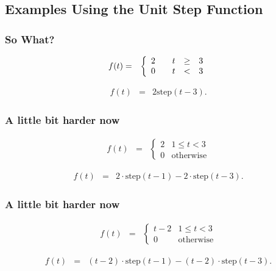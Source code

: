 \subsection{Examples Using the Unit Step Function}

\begin{frame}
  \frametitle{So What?}

  \begin{eqnarray*}
      f(t) & = & 
      \left\{
        \begin{array}{r@{\hspace{2em}}rcl}
          2 & t & \geq & 3 \\
          0 & t & < & 3
        \end{array}
      \right.
  \end{eqnarray*}

  {
    \begin{eqnarray*}
      f(t) & = & 2\mathrm{step}(t-3).
    \end{eqnarray*}
  }

\end{frame}


\begin{frame}
  \frametitle{A little bit harder now}

  \begin{eqnarray*}
      f(t) & = & 
      \left\{
        \begin{array}{rr}
          2 & 1\leq t < 3 \\
          0 & \mathrm{otherwise}
        \end{array}
      \right.
  \end{eqnarray*}

  {
    \begin{eqnarray*}
      f(t) & = & 2\cdot\mathrm{step}(t-1) - 2\cdot\mathrm{step}(t-3).
    \end{eqnarray*}
  }

\end{frame}

\begin{frame}
  \frametitle{A little bit harder now}

  \begin{eqnarray*}
      f(t) & = & 
      \left\{
        \begin{array}{rr}
          t-2 & 1\leq t < 3 \\
          0 & \mathrm{otherwise}
        \end{array}
      \right.
  \end{eqnarray*}

  {
    \begin{eqnarray*}
      f(t) & = & (t-2)\cdot\mathrm{step}(t-1) - (t-2)\cdot\mathrm{step}(t-3).
    \end{eqnarray*}
  }

\end{frame}

